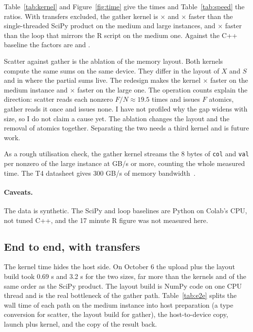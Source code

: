 \documentclass[sigconf,nonacm]{acmart}
\newcommand{\code}[1]{\texttt{#1}}
\begin{document}
Table~\ref{tab:kernel} and Figure~\ref{fig:time} give the times and Table~\ref{tab:speed} the
ratios. With transfers excluded, the gather kernel is \VsScipyMedium{}$\times$ and
\VsScipyLarge{}$\times$ faster than the single-threaded SciPy product on the medium and large
instances, and \VsLoopMedium{}$\times$ faster than the loop that mirrors the R script on the medium
one. Against the C++ baseline the factors are \VsCppMedium{} and \VsCppLarge{}.

Scatter against gather is the ablation of the memory layout. Both kernels compute the same sums on
the same device. They differ in the layout of $X$ and $S$ and in where the partial sums live. The
redesign makes the kernel \AblationMedium{}$\times$ faster on the medium instance and
\AblationLarge{}$\times$ faster on the large one. The operation counts explain the direction: scatter
reads each nonzero $F/N \approx 19.5$ times and issues $F$ atomics, gather reads it once and issues
none. I have not profiled why the gap widens with size, so I do not claim a cause yet. The ablation
changes the layout and the removal of atomics together. Separating the two needs a third kernel and
is future work.

As a rough utilisation check, the gather kernel streams the 8 bytes of \code{col} and \code{val} per
nonzero of the large instance at \GatherGBps{} GB/s or more, counting the whole measured time. The T4
datasheet gives 300 GB/s of memory bandwidth~\cite{t4datasheet}.

\paragraph{Caveats.} The data is synthetic. The SciPy and loop baselines are Python on Colab's CPU,
not tuned C++, and the 17 minute R figure was not measured here. \ResCaveat

\subsection{End to end, with transfers}

The kernel time hides the host side. On October 6 the upload plus the layout build took 0.69 s and
3.2 s for the two sizes, far more than the kernels and of the same order as the SciPy product. The
layout build is NumPy code on one CPU thread and is the real bottleneck of the gather path.
Table~\ref{tab:e2e} splits the wall time of each path on the medium instance into host preparation
(a type conversion for scatter, the layout build for gather), the host-to-device copy, launch plus
kernel, and the copy of the result back. \EndToEndVerdict
\end{document}
